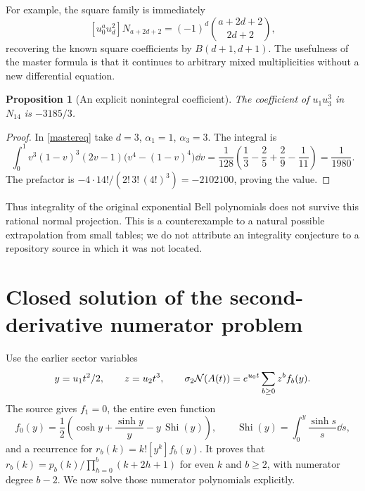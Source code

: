 \documentclass[11pt]{article}
\numberwithin{equation}{section}
\newtheorem{proposition}[theorem]{Proposition}
\theoremstyle{definition}\newtheorem{definition}[theorem]{Definition}
\theoremstyle{remark}\newtheorem{remark}[theorem]{Remark}
\begin{document}
For example, the square family is immediately
\begin{equation}\label{squares}
 [u_0^a u_d^2]N_{a+2d+2}
 =(-1)^d\binom{a+2d+2}{2d+2},
\end{equation}
recovering the known square coefficients by $B(d+1,d+1)$. The usefulness of the master formula is that it continues to arbitrary mixed multiplicities without a new differential equation.

\begin{proposition}[An explicit nonintegral coefficient]\label{noninteger}
The coefficient of $u_1u_3^3$ in $N_{14}$ is $-3185/3$.
\end{proposition}
\begin{proof}
In \eqref{mastereq} take $d=3$, $\alpha_1=1$, $\alpha_3=3$. The integral is
\[
 \int_0^1v^3(1-v)^3(2v-1)\bigl(v^4-(1-v)^4\bigr)\dd v
 =\frac1{128}\left(\frac13-\frac25+\frac29-\frac1{11}\right)
 =\frac1{1980}.
\]
The prefactor is $-4\cdot14!/(2!\,3!\,(4!)^3)=-2102100$, proving the value.
\end{proof}
Thus integrality of the original exponential Bell polynomials does not survive this rational normal projection. This is a counterexample to a natural possible extrapolation from small tables; we do not attribute an integrality conjecture to a repository source in which it was not located.

\section{Closed solution of the second-derivative numerator problem}
Use the earlier sector variables
\[
 y=u_1t^2/2,\qquad z=u_2t^3,\qquad
 \sigma_2\mathcal N(A(t))=e^{u_0t}\sum_{b\ge0}z^bf_b(y).
\]
The source \cite{sector} gives $f_1=0$, the entire even function
\[
 f_0(y)=\frac12\left(\cosh y+\frac{\sinh y}{y}-y\,\operatorname{Shi}(y)\right),
 \qquad \operatorname{Shi}(y)=\int_0^y\frac{\sinh s}{s}\dd s,
\]
and a recurrence for $r_b(k)=k![y^k]f_b(y)$. It proves that
$r_b(k)=p_b(k)/\prod_{h=0}^b(k+2h+1)$ for even $k$ and $b\ge2$, with numerator degree $b-2$. We now solve those numerator polynomials explicitly.
\end{document}
